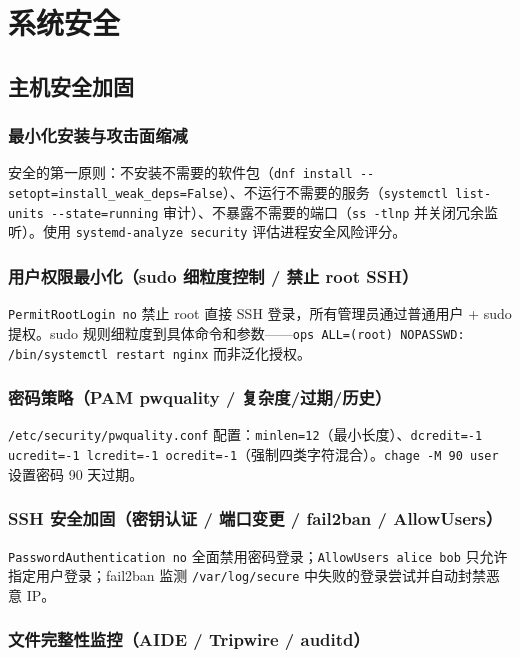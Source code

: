 \documentclass[12pt,UTF8]{ctexbook}
\begin{document}
\part{系统安全}

\chapter{主机安全加固}
\label{chap:host-security}

\section{最小化安装与攻击面缩减}

安全的第一原则：不安装不需要的软件包（\verb|dnf install --setopt=install_weak_deps=False|）、不运行不需要的服务（\verb|systemctl list-units --state=running| 审计）、不暴露不需要的端口（\verb|ss -tlnp| 并关闭冗余监听）。使用 \verb|systemd-analyze security| 评估进程安全风险评分。

  \section{用户权限最小化（sudo 细粒度控制 / 禁止 root SSH）}

\verb|PermitRootLogin no| 禁止 root 直接 SSH 登录，所有管理员通过普通用户 + sudo 提权。sudo 规则细粒度到具体命令和参数——\verb|ops ALL=(root) NOPASSWD: /bin/systemctl restart nginx| 而非泛化授权。

  \section{密码策略（PAM pwquality / 复杂度/过期/历史）}

\verb|/etc/security/pwquality.conf| 配置：\verb|minlen=12|（最小长度）、\verb|dcredit=-1 ucredit=-1 lcredit=-1 ocredit=-1|（强制四类字符混合）。\verb|chage -M 90 user| 设置密码 90 天过期。

  \section{SSH 安全加固（密钥认证 / 端口变更 / fail2ban / AllowUsers）}

\verb|PasswordAuthentication no| 全面禁用密码登录；\verb|AllowUsers alice bob| 只允许指定用户登录；fail2ban 监测 \verb|/var/log/secure| 中失败的登录尝试并自动封禁恶意 IP。

  \section{文件完整性监控（AIDE / Tripwire / auditd）}
\end{document}
